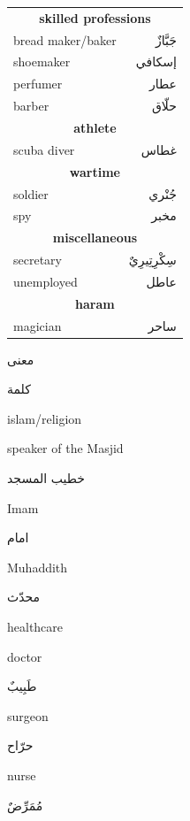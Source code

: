\documentclass[]{book}
\begin{document}
\begin{table}[]
\begin{tabular}{lr}
\multicolumn{2}{c}{\textbf{skilled professions}}                      \\
bread maker/baker                 & جَبَّازٌ                          \\
shoemaker                         & إسكافي                            \\
perfumer                          & عطار                              \\
barber                            & حلّاق                             \\
\multicolumn{2}{c}{\textbf{athlete}}                                  \\
scuba diver                       & غطاس                              \\
\multicolumn{2}{c}{\textbf{wartime}}                                  \\
soldier                           & جُنْري                            \\
spy                               & مخبر                              \\
\multicolumn{2}{c}{\textbf{miscellaneous}}                            \\
secretary                         & سِكْرِتِيرِيٌ                     \\
unemployed                        & عاطل                              \\
\multicolumn{2}{c}{\textbf{haram}}                                    \\
magician                          & ساحر                             
\end{tabular}
\end{table}

معنى

كلمة

{islam/religion}

speaker of the Masjid

خطيب المسجد

Imam

امام

Muhaddith

محدّث

{healthcare}

doctor

طَبِيبٌ

surgeon

حرّاح

nurse

مُمَرِّضٌ
\end{document}
